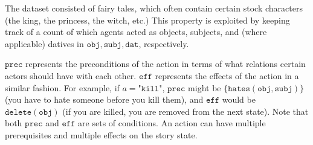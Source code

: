 The dataset consisted of fairy tales, which often contain certain stock 
characters (the king, the princess, the witch, etc.)
This property is exploited by keeping track of a count of which agents
acted as objects, subjects, and (where applicable) datives in 
$\texttt{obj}, \texttt{subj}, \texttt{dat}$, respectively.

$\texttt{prec}$ represents the preconditions of the action in terms of what 
relations certain actors should have with each other.
$\texttt{eff}$ represents the effects of the action in a similar fashion.
For example, if $a = \texttt{"kill"}$, $\texttt{prec}$ might be 
$ \{\texttt{hates}(\texttt{obj}, \texttt{subj})\} $ (you have to hate someone 
before you kill them), and $\texttt{eff}$ would be ${\texttt{delete}(\texttt{obj})}$
(if you are killed, you are removed from the next state).
Note that both $\texttt{prec}$ and $\texttt{eff}$ are sets of conditions.
An action can have multiple prerequisites and multiple effects on the story state.
